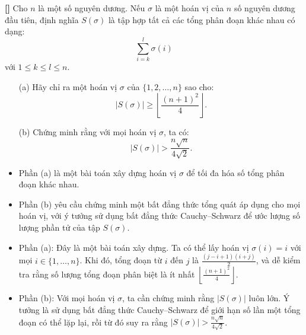 \documentclass[../03-arithmetic-functions.tex]{subfiles}
\begin{document}
\begin{exercise*}\label{example:ROU-2015-TST-D4-P2}\textbf{[]}
    Cho \( n \) là một số nguyên dương. Nếu \( \sigma \) là một hoán vị của \( n \) số nguyên dương đầu tiên,
    định nghĩa \( S(\sigma) \) là tập hợp tất cả các tổng phân đoạn khác nhau có dạng:
    \[
        \sum_{i=k}^{l} \sigma(i)
    \]
    với \( 1 \le k \le l \le n \).
    
    \begin{itemize}[topsep=0pt, partopsep=0pt, itemsep=0pt]
        \item[(a)] Hãy chỉ ra một hoán vị \( \sigma \) của \( \{1, 2, \ldots, n\} \) sao cho:
        \[
            |S(\sigma)| \geq \left\lfloor \frac{(n+1)^2}{4} \right\rfloor.
        \]
        \item[(b)] Chứng minh rằng với mọi hoán vị \( \sigma \), ta có:
        \[
            |S(\sigma)| > \frac{n\sqrt{n}}{4\sqrt{2}}.
        \]
    \end{itemize}
\end{exercise*}

\begin{remark*}
    \begin{itemize}[topsep=0pt, partopsep=0pt, itemsep=0pt]
        \item Phần (a) là một bài toán xây dựng hoán vị \(\sigma\) để tối đa hóa số tổng phân đoạn khác nhau.
        \item Phần (b) yêu cầu chứng minh một bất đẳng thức tổng quát áp dụng cho mọi hoán vị, với ý tưởng sử dụng bất đẳng thức Cauchy–Schwarz để ước lượng số lượng phần tử của tập \( S(\sigma) \).
    \end{itemize}
\end{remark*}

\begin{story*}
    \begin{itemize}[topsep=0pt, partopsep=0pt, itemsep=0pt]
        \item Phần (a): Đây là một bài toán xây dựng. Ta có thể lấy hoán vị \(\sigma(i) = i\) với mọi \( i \in \{1, \dots, n\} \).
        Khi đó, tổng đoạn từ \( i \) đến \( j \) là \( \frac{(j - i + 1)(i + j)}{2} \), và dễ kiểm tra rằng số lượng tổng đoạn phân biệt là ít nhất \( \left\lfloor \frac{(n+1)^2}{4} \right\rfloor \).

        \item Phần (b): Với mọi hoán vị \(\sigma\), ta cần chứng minh rằng \( |S(\sigma)| \) luôn lớn.
        Ý tưởng là sử dụng bất đẳng thức Cauchy–Schwarz để giới hạn số lần một tổng đoạn có thể lặp lại,
        rồi từ đó suy ra rằng \( |S(\sigma)| > \frac{n\sqrt{n}}{4\sqrt{2}} \).
    \end{itemize}
\end{story*}
\end{document}
